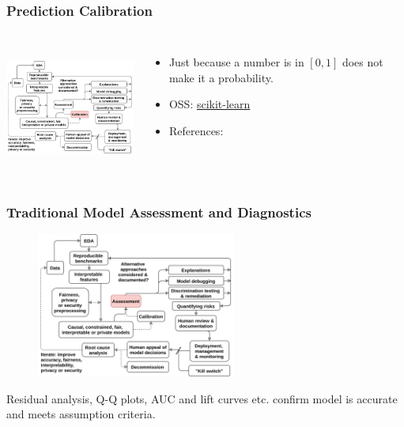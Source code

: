 \documentclass[11pt,
               aspectratio=169,
               hyperref={colorlinks}
               ]{beamer}
\begin{document}
			\begin{frame}
		
				\frametitle{Prediction Calibration}		
			
				\begin{columns}
	
					\centering
					\includegraphics[height=120pt]{../img/calibrate.png}
				
					\begin{itemize}
						\item Just because a number is in $[0,1]$ does not make it a probability. 
						\item OSS: \href{https://scikit-learn.org/stable/modules/calibration.html}{scikit-learn} 
						\item References: 
					\end{itemize}
				
				\end{columns}			

			\end{frame}
	
			\begin{frame}
		
				\frametitle{Traditional Model Assessment and Diagnostics}		
			
				\begin{figure}[htb]
					\begin{center}
						\includegraphics[height=135pt]{../img/ma.png}
					\end{center}
				\end{figure}	

			\vspace{-10pt}
			\scriptsize{Residual analysis, Q-Q plots, AUC and lift curves etc. confirm model is accurate and meets assumption criteria.}
		
			\end{frame}
					
\end{document}
